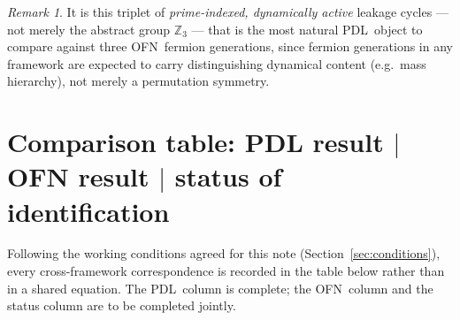 \documentclass[11pt,a4paper]{article}
\theoremstyle{plain}
\theoremstyle{definition}
\theoremstyle{remark}
\newtheorem{remark}[theorem]{Remark}
\newcommand{\PDL}{\textnormal{PDL}}
\newcommand{\OFN}{\textnormal{OFN}}
\newcommand{\Zthree}{\mathbb{Z}_3}
\begin{document}
\begin{remark}
It is this triplet of \emph{prime-indexed, dynamically active} leakage cycles --- not merely the abstract group $\Zthree$ --- that is the most natural \PDL\ object to compare against three \OFN\ fermion generations, since fermion generations in any framework are expected to carry distinguishing dynamical content (e.g.\ mass hierarchy), not merely a permutation symmetry.
\end{remark}

\section{Comparison table: PDL result \texorpdfstring{$\vert$}{|} OFN result \texorpdfstring{$\vert$}{|} status of identification}
\label{sec:comparison}

Following the working conditions agreed for this note (Section~\ref{sec:conditions}), every cross-framework correspondence is recorded in the table below rather than in a shared equation. The \PDL\ column is complete; the \OFN\ column and the status column are to be completed jointly.
\end{document}
